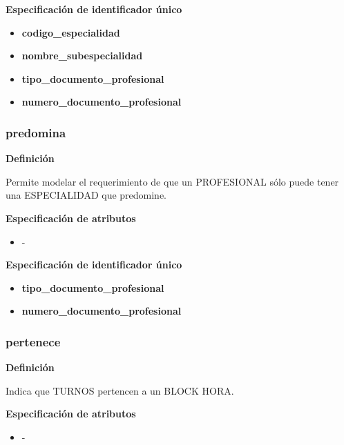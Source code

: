 \documentclass[a4paper,11pt]{article}
\begin{document}
\textbf{Especificación de identificador único}

\begin{itemize}

    \item \textbf{codigo\_especialidad}
   
    \item \textbf{nombre\_subespecialidad}

    \item \textbf{tipo\_documento\_profesional}

    \item \textbf{numero\_documento\_profesional}   
	
\end{itemize}

\subsubsection{\textbf{predomina}}

\textbf{Definición}

Permite modelar el requerimiento de que un PROFESIONAL sólo puede tener una ESPECIALIDAD 
que predomine.

\textbf{Especificación de atributos}

\begin{itemize}
\item -
\end{itemize}

\textbf{Especificación de identificador único}

\begin{itemize}

    \item \textbf{tipo\_documento\_profesional}

    \item \textbf{numero\_documento\_profesional}

\end{itemize}

\subsubsection{\textbf{pertenece}}

\textbf{Definición}

Indica que TURNOS pertencen a un BLOCK HORA.

\textbf{Especificación de atributos}

\begin{itemize}

    \item -

\end{itemize}
\end{document}
